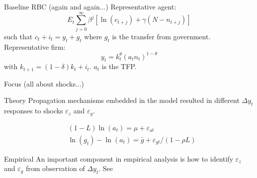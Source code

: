 \documentclass[10pt]{beamer}
\begin{document}
\begin{frame}{Baseline RBC (again and again...)}
    Representative agent:
    \begin{equation}
        E_{t} \sum_{j=0}^{\infty} \beta^{j} \left[\ln (c_{t+j})+\gamma(N-n_{t+j})\right]
    \end{equation}
    such that $c_t + i_t = y_t + g_t$  where \alert{$g_t$} is the transfer from government.\\
    Representative firm:
    \begin{equation}
        y_t = k_t^{\theta} (a_t n_t)^{1-\theta}
    \end{equation}
    with $k_{t+1} = (1-\delta) k_t + i_t$. \alert{$a_t$} is the TFP. \\[1em]

\end{frame}

\begin{frame}{Focus (all about shocks...)}
    \begin{exampleblock}{Theory}
        Propagation mechanisms embedded in the model resulted in different $\Delta y_t$ responses to shocks $\varepsilon_z$ and $\varepsilon_g$.
    \end{exampleblock}
    \begin{align}
         & (1-L) \ln \left(a_{t}\right)=\mu+\varepsilon_{\mathrm{a} t}                         \\
         & \ln \left(g_{t}\right)-\ln \left(a_{t}\right)=\bar{g}+\varepsilon_{g t} /(1-\rho L)
    \end{align}

    \begin{exampleblock}{Empirical}
        An important component in empirical analysis is how to identify $\varepsilon_z$ and $\varepsilon_g$ from observation of $\Delta y_t$. See \cite{blanchard_quah_1988}
    \end{exampleblock}
\end{frame}
\end{document}
